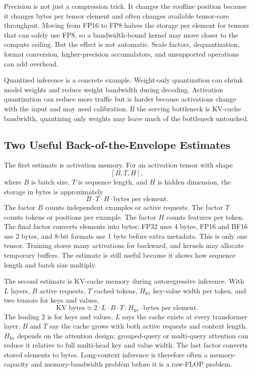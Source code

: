 Precision is not just a compression trick. It changes the roofline position because it changes bytes per tensor element and often changes available tensor-core throughput. Moving from FP16 to FP8 halves the storage per element for tensors that can safely use FP8, so a bandwidth-bound kernel may move closer to the compute ceiling. But the effect is not automatic. Scale factors, dequantization, format conversion, higher-precision accumulators, and unsupported operations can add overhead.

Quantized inference is a concrete example. Weight-only quantization can shrink model weights and reduce weight bandwidth during decoding. Activation quantization can reduce more traffic but is harder because activations change with the input and may need calibration. If the serving bottleneck is KV-cache bandwidth, quantizing only weights may leave much of the bottleneck untouched.

\subsection{Two Useful Back-of-the-Envelope Estimates}

The first estimate is activation memory. For an activation tensor with shape
\[
  [B, T, H],
\]
where \(B\) is batch size, \(T\) is sequence length, and \(H\) is hidden dimension, the storage in bytes is approximately
\[
  B \cdot T \cdot H \cdot \text{bytes per element}.
\]
The factor \(B\) counts independent examples or active requests. The factor \(T\) counts tokens or positions per example. The factor \(H\) counts features per token. The final factor converts elements into bytes: FP32 uses 4 bytes, FP16 and BF16 use 2 bytes, and 8-bit formats use 1 byte before extra metadata. This is only one tensor. Training stores many activations for backward, and kernels may allocate temporary buffers. The estimate is still useful because it shows how sequence length and batch size multiply.

The second estimate is KV-cache memory during autoregressive inference. With \(L\) layers, \(B\) active requests, \(T\) cached tokens, \(H_{\text{kv}}\) key-value width per token, and two tensors for keys and values,
\[
  \text{KV bytes}
  \approx
  2 \cdot L \cdot B \cdot T \cdot H_{\text{kv}}
  \cdot \text{bytes per element}.
\]
The leading \(2\) is for keys and values. \(L\) says the cache exists at every transformer layer. \(B\) and \(T\) say the cache grows with both active requests and context length. \(H_{\text{kv}}\) depends on the attention design; grouped-query or multi-query attention can reduce it relative to full multi-head key and value width. The last factor converts stored elements to bytes. Long-context inference is therefore often a memory-capacity and memory-bandwidth problem before it is a raw-FLOP problem.

